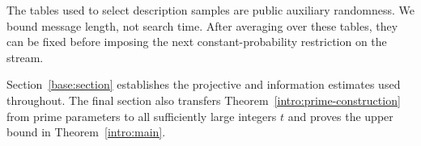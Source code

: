 The tables used to select description samples are public auxiliary
randomness. We bound message length, not search time. After averaging
over these tables, they can be fixed before imposing the next
constant-probability restriction on the stream.

Section~\ref{base:section} establishes the projective and information
estimates used throughout. The final section also transfers
Theorem~\ref{intro:prime-construction} from prime parameters to all
sufficiently large integers $t$ and proves the upper bound in
Theorem~\ref{intro:main}.
